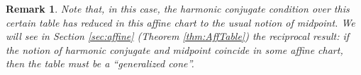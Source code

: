 \documentclass{article}
\newcommand{\R}{\mathbb{R}} %
\newtheorem{prop}{Proposition}[section]
\newtheorem{rmk}{Remark}
\begin{document}

\begin{rmk}
    Note that, in this case, the harmonic conjugate condition over this certain table has reduced in this affine chart to the usual notion of midpoint. %
    We will see in Section \ref{sec:affine} 
    (Theorem \ref{thm:AffTable}) the reciprocal result: if the notion of harmonic conjugate 
    and midpoint coincide in some affine chart, then the table must be a ``generalized 
    cone''.
\end{rmk}
\end{document}
